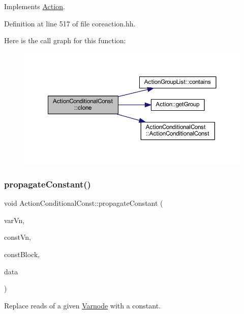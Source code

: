 Implements \mbox{\hyperlink{class_action_af8242e41d09e5df52f97df9e65cc626f}{Action}}.



Definition at line 517 of file coreaction.\+hh.

Here is the call graph for this function\+:
\nopagebreak
\begin{figure}[H]
\begin{center}
\leavevmode
\includegraphics[width=350pt]{class_action_conditional_const_a5ff6a3cc3aa54f9a8a276c9e8090010f_cgraph}
\end{center}
\end{figure}
\mbox{\label{class_action_conditional_const_ab477e0173dc6a85b8a7aeee5c0c41bfc}} 
\subsubsection{\texorpdfstring{propagateConstant()}{propagateConstant()}}
{\footnotesize\ttfamily void Action\+Conditional\+Const\+::propagate\+Constant (\begin{DoxyParamCaption}\item[{\mbox{\hyperlink{class_varnode}{Varnode}} $\ast$}]{var\+Vn,  }\item[{\mbox{\hyperlink{class_varnode}{Varnode}} $\ast$}]{const\+Vn,  }\item[{\mbox{\hyperlink{class_flow_block}{Flow\+Block}} $\ast$}]{const\+Block,  }\item[{\mbox{\hyperlink{class_funcdata}{Funcdata}} \&}]{data }\end{DoxyParamCaption})}



Replace reads of a given \mbox{\hyperlink{class_varnode}{Varnode}} with a constant. 

